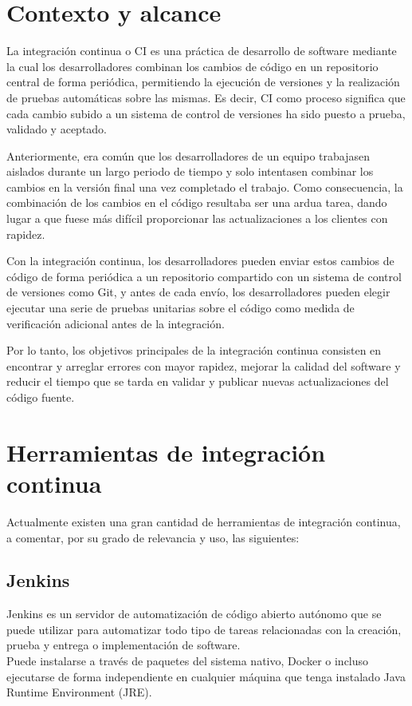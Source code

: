 \section{Contexto y alcance}

La integración continua o CI es una práctica de desarrollo de software mediante la cual los desarrolladores combinan los cambios de código en un repositorio central de forma periódica, permitiendo la ejecución de versiones y la realización de pruebas automáticas sobre las mismas. Es decir, CI como proceso significa que cada cambio subido a un sistema de control de versiones ha sido puesto a prueba, validado y aceptado.

Anteriormente, era común que los desarrolladores de un equipo trabajasen aislados durante un largo periodo de tiempo y solo intentasen combinar los cambios en la versión final una vez completado el trabajo. Como consecuencia, la combinación de los cambios en el código resultaba ser una ardua tarea, dando lugar a que fuese más difícil proporcionar las actualizaciones a los clientes con rapidez.

Con la integración continua, los desarrolladores pueden enviar estos cambios de código de forma periódica a un repositorio compartido con un sistema de control de versiones como Git, y antes de cada envío, los desarrolladores pueden elegir ejecutar una serie de pruebas unitarias sobre el código como medida de verificación adicional antes de la integración.

Por lo tanto, los objetivos principales de la integración continua consisten en encontrar y arreglar errores con mayor rapidez, mejorar la calidad del software y reducir el tiempo que se tarda en validar y publicar nuevas actualizaciones del código fuente.

\section{Herramientas de integración continua}
Actualmente existen una gran cantidad de herramientas de integración continua, a comentar, por su grado de relevancia y uso, las siguientes:
\subsection{Jenkins}
Jenkins es un servidor de automatización de código abierto autónomo que se puede utilizar para automatizar todo tipo de tareas relacionadas con la creación, prueba y entrega o implementación de software.\\
Puede instalarse a través de paquetes del sistema nativo, Docker o incluso ejecutarse de forma independiente en cualquier máquina que tenga instalado Java Runtime Environment (JRE).

